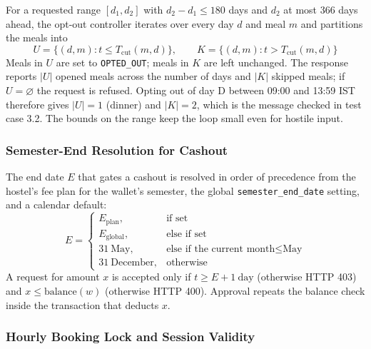 \documentclass[11pt,a4paper]{article}
\begin{document}
For a requested range $[d_1, d_2]$ with $d_2 - d_1 \leq 180$ days and $d_2$ at
most 366 days ahead, the opt-out controller iterates over every day $d$ and
meal $m$ and partitions the meals into
\begin{equation}
U = \{(d,m) : t \leq T_{\text{cut}}(m,d)\}, \qquad K = \{(d,m) : t > T_{\text{cut}}(m,d)\}
\end{equation}
Meals in $U$ are set to \texttt{OPTED\_OUT}; meals in $K$ are left unchanged.
The response reports $|U|$ opened meals across the number of days and $|K|$
skipped meals; if $U = \varnothing$ the request is refused. Opting out of day D
between 09:00 and 13:59 IST therefore gives $|U| = 1$ (dinner) and $|K| = 2$,
which is the message checked in test case 3.2. The bounds on the range keep the
loop small even for hostile input.

\subsubsection{Semester-End Resolution for Cashout}

The end date $E$ that gates a cashout is resolved in order of precedence from
the hostel's fee plan for the wallet's semester, the global
\texttt{semester\_end\_date} setting, and a calendar default:
\begin{equation}
E =
\begin{cases}
E_{\text{plan}}, & \text{if set}\\
E_{\text{global}}, & \text{else if set}\\
31\ \text{May}, & \text{else if the current month} \leq \text{May}\\
31\ \text{December}, & \text{otherwise}
\end{cases}
\end{equation}
A request for amount $x$ is accepted only if $t \geq E + 1\ \text{day}$
(otherwise HTTP 403) and $x \leq \text{balance}(w)$ (otherwise HTTP 400).
Approval repeats the balance check inside the transaction that deducts $x$.

\subsubsection{Hourly Booking Lock and Session Validity}
\end{document}
